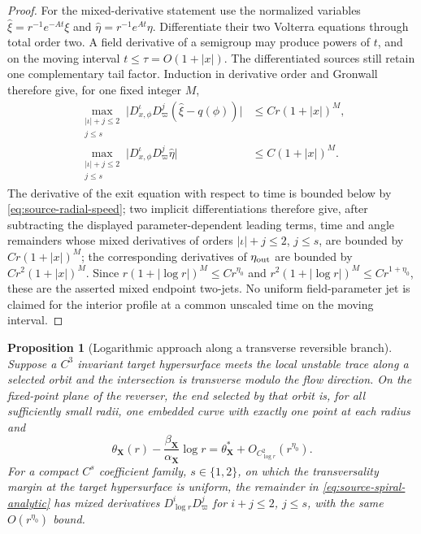 \documentclass[11pt]{amsart}
\numberwithin{equation}{section}
\newtheorem{proposition}[theorem]{Proposition}
\theoremstyle{definition}
\theoremstyle{remark}
\begin{document}
\begin{proof}
For the mixed-derivative statement use the normalized variables
$\widehat\xi=r^{-1}e^{-At}\xi$ and
$\widehat\eta=r^{-1}e^{At}\eta$.  Differentiate their two Volterra
equations through total order two.  A field derivative of a semigroup may
produce powers of $t$, and on the moving interval
$t\le\tau=O(1+|x|)$.  The differentiated sources still retain one
complementary tail factor.  Induction in derivative order and Gronwall
therefore give, for one fixed integer $M$,
\begin{equation}\label{eq:source-normalized-jets}
 \begin{aligned}
 \max_{\substack{|\iota|+j\le2\\j\le s}}
 \bigl|D_{x,\phi}^{\iota}D_\varpi^j
       (\widehat\xi-q(\phi))\bigr|
 &\le Cr(1+|x|)^M,\\
 \max_{\substack{|\iota|+j\le2\\j\le s}}
 \bigl|D_{x,\phi}^{\iota}D_\varpi^j\widehat\eta\bigr|
 &\le C(1+|x|)^M.
 \end{aligned}
\end{equation}
The derivative of the exit equation with respect to time is bounded below
by \eqref{eq:source-radial-speed}; two implicit differentiations therefore
give, after subtracting the displayed parameter-dependent leading terms,
time and angle remainders whose mixed derivatives of orders
$|\iota|+j\le2$, $j\le s$, are bounded by
$Cr(1+|x|)^M$; the corresponding derivatives of $\eta_{\rm out}$ are
bounded by $Cr^2(1+|x|)^M$.
Since $r(1+|\log r|)^M\le C r^{\eta_0}$ and
$r^2(1+|\log r|)^M\le C r^{1+\eta_0}$, these are the asserted mixed
endpoint two-jets.  No uniform field-parameter jet is claimed for the
interior profile at a common unscaled time on the moving interval.
\end{proof}

\begin{proposition}[Logarithmic approach along a transverse reversible branch]
\label{prop:source-spiral}
Suppose a $C^3$ invariant target hypersurface meets the local unstable
trace along a selected orbit and the intersection is transverse modulo the
flow direction.  On the fixed-point plane of the reverser, the end selected
by that orbit is, for all sufficiently small radii, one embedded curve with
exactly one point at each radius and
\begin{equation}\label{eq:source-spiral-analytic}
 \theta_{\mathbf X}(r)
  -\frac{\beta_{\mathbf X}}{\alpha_{\mathbf X}}\log r
  =\theta_{\mathbf X}^*
       +O_{C^2_{\log r}}(r^{\eta_0}).
\end{equation}
For a compact $C^s$ coefficient family, $s\in\{1,2\}$, on which the
transversality margin at the target hypersurface is uniform, the remainder
in \eqref{eq:source-spiral-analytic} has mixed derivatives
$D_{\log r}^iD_\varpi^j$ for $i+j\le2$, $j\le s$, with the same
$O(r^{\eta_0})$ bound.
\end{proposition}
\end{document}
